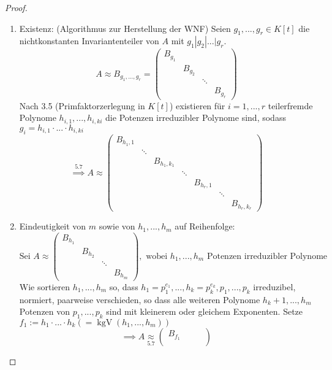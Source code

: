 \documentclass[a4paper, titlepage]{article}
\theoremstyle{definition}
\begin{document}
\begin{proof}
    \begin{enumerate}[1.]
        \item Existenz: (Algorithmus zur Herstellung der WNF)\newline 
        Seien $g_1,...,g_r\in K[t]$ die nichtkonstanten Invariantenteiler von $A$ mit $g_1|g_2|...|g_r.$
        $$A\approx B_{g_1,...,g_r}=\begin{pmatrix}  B_{g_1}& & &\\
            & B_{g_2}& & \\
            & & \ddots & \\
            & & & B_{g_r}
        \end{pmatrix}$$
        Nach 3.5 (Primfaktorzerlegung in $K[t]$) existieren für $i=1,...,r$ teilerfremde Polynome $h_{i,1},...,h_{i,ki}$ die Potenzen irreduzibler Polynome sind, sodass $g_i=h_{i,1}\cdot...\cdot h_{i,ki}$
        $$\overset{5.7}{\implies} A\approx \begin{pmatrix}
            B_{h_1,1}& & & & & & \\
            & \ddots & & & & & \\
            & & B_{h_1,k_1}& & & &\\
            & & &\ddots & & &\\
            & & & &B_{h_r,1}& &\\
            & & & & &\ddots & \\
            & & & & & &B_{h_r,k_r}
        \end{pmatrix}$$
        \item Eindeutigkeit von $m$ sowie von $h_1,...,h_m$ auf Reihenfolge: 
        $$\text{Sei }A\approx  \begin{pmatrix} B_{h_1}& & &\\
        & B_{h_2}& & \\
        & & \ddots & \\
        & & & B_{h_m}
    \end{pmatrix}, \text{ wobei }h_1,...,h_m \text{ Potenzen irreduzibler Polynome}$$
    Wie sortieren $h_1,...,h_m$ so, dass $h_1=p_1^{e_1},...,h_k=p_k^{e_k}, p_1,...,p_k$ irreduzibel, normiert, paarweise verschieden, so dass alle weiteren Polynome $h_k+1,...,h_m$ Potenzen von $p_1,...,p_k$ sind mit kleinerem oder gleichem Exponenten. Setze $f_1:=h_1\cdot ...\cdot h_k(=\operatorname{kgV}(h_1,...,h_m))$
    $$\implies A\underset{5.7}{\approx}
    \begin{pmatrix} 
        B_{f_1}& & & \\

\end{pmatrix}$$
\end{enumerate}
\end{proof}
\end{document}
